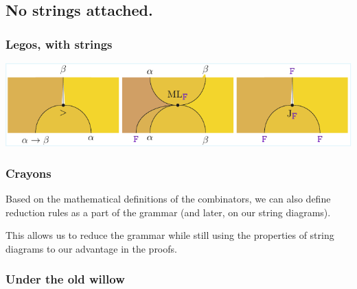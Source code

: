 \documentclass[math, english, info]{beamercours}
\begin{document}
\subsection{No strings attached.}
\begin{frame}
	\frametitle{Legos, with strings}
	\includegraphics[width=\textwidth]{aux/figures/combinators-sd.pdf}
\end{frame}

\begin{frame}
	\frametitle{Crayons}
	Based on the mathematical definitions of the combinators, we can also define
	reduction rules as a part of the grammar (and later, on our string diagrams).

	This allows us to reduce the grammar while still using the properties of
	string diagrams to our advantage in the proofs.
\end{frame}

\begin{frame}
	\frametitle{Under the old willow}
\end{frame}
\end{document}
